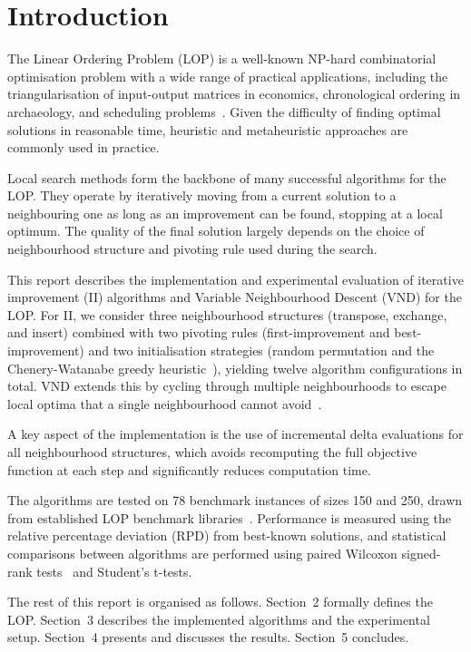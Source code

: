 \chapter{Introduction}

The Linear Ordering Problem (LOP) is a well-known NP-hard combinatorial
optimisation problem with a wide range of practical applications, including the
triangularisation of input-output matrices in economics, chronological ordering
in archaeology, and scheduling problems~\cite{SchStu04, MarReiDua12}.
Given the difficulty of finding optimal solutions in reasonable time, heuristic
and metaheuristic approaches are commonly used in practice.

Local search methods form the backbone of many successful algorithms for the
LOP. They operate by iteratively moving from a current solution to a
neighbouring one as long as an improvement can be found, stopping at a local
optimum. The quality of the final solution largely depends on the choice of
neighbourhood structure and pivoting rule used during the search.

This report describes the implementation and experimental evaluation of
iterative improvement (II) algorithms and Variable Neighbourhood Descent (VND)
for the LOP. For II, we consider three neighbourhood structures (transpose,
exchange, and insert) combined with two pivoting rules (first-improvement
and best-improvement) and two initialisation strategies (random permutation
and the Chenery-Watanabe greedy heuristic~\cite{CheWat58}), yielding twelve
algorithm configurations in total. VND extends this by cycling through
multiple neighbourhoods to escape local optima that a single neighbourhood
cannot avoid~\cite{HanMla01}.

A key aspect of the implementation is the use of incremental delta evaluations
for all neighbourhood structures, which avoids recomputing the full objective
function at each step and significantly reduces computation time.

The algorithms are tested on 78 benchmark instances of sizes 150 and 250,
drawn from established LOP benchmark libraries~\cite{MarReiDua12}. Performance
is measured using the relative percentage deviation (RPD) from best-known
solutions, and statistical comparisons between algorithms are performed using
paired Wilcoxon signed-rank tests~\cite{Wilcoxon45} and Student's t-tests.

The rest of this report is organised as follows. Section~2 formally defines
the LOP. Section~3 describes the implemented algorithms and the experimental
setup. Section~4 presents and discusses the results. Section~5 concludes.

